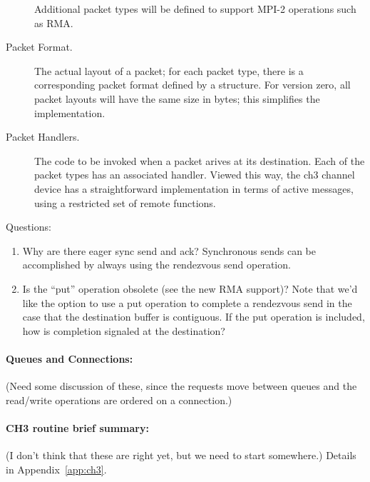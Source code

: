 \documentclass{article}
\begin{document}
\begin{description}
\begin{description}
    \end{description}
    Additional packet types will be defined to support MPI-2 operations such
    as RMA.
\item[Packet Format.]The actual layout of a packet; for each packet type, there
  is a corresponding packet format defined by a structure.  For version zero,
  all packet layouts will have the same size in bytes; this simplifies
  the implementation.
\item[Packet Handlers.]The code to be invoked when a packet arives at its
  destination.   Each of the packet types has an associated handler.
  Viewed this way, the ch3 channel device has a straightforward
  implementation in terms of active messages, using a restricted set
  of remote functions.
\end{description}

Questions:
\begin{enumerate}
\item Why are there eager sync send and ack?  Synchronous sends can be
  accomplished by always using the rendezvous send operation.
\item Is the ``put'' operation obsolete (see the new RMA support)?
  Note that we'd like the option to use a put operation to complete a
  rendezvous send in the case that the destination buffer is
  contiguous.  If the put operation is included, how is completion
  signaled at the destination?
\end{enumerate}

\paragraph{Queues and Connections:}

(Need some discussion of these, since the requests move between queues and the 
read/write operations are ordered on a connection.)

\paragraph{CH3 routine brief summary:}

(I don't think that these are right yet, but we need to start somewhere.)
Details in Appendix~\ref{app:ch3}.
\end{document}
